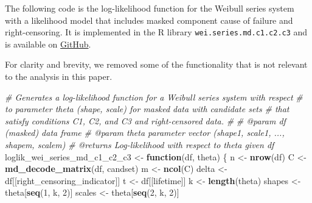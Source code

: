 \documentclass[
]{article}
\newenvironment{Shaded}{\begin{snugshade}}{\end{snugshade}}
\newcommand{\CommentTok}[1]{\textcolor[rgb]{0.56,0.35,0.01}{\textit{#1}}}
\newcommand{\ControlFlowTok}[1]{\textcolor[rgb]{0.13,0.29,0.53}{\textbf{#1}}}
\newcommand{\DecValTok}[1]{\textcolor[rgb]{0.00,0.00,0.81}{#1}}
\newcommand{\KeywordTok}[1]{\textcolor[rgb]{0.13,0.29,0.53}{\textbf{#1}}}
\newcommand{\NormalTok}[1]{#1}
\newcommand{\StringTok}[1]{\textcolor[rgb]{0.31,0.60,0.02}{#1}}
\begin{document}
\label{app:loglike-code}

The following code is the log-likelihood function for the Weibull series
system with a likelihood model that includes masked component cause of
failure and right-censoring. It is implemented in the R library
\texttt{wei.series.md.c1.c2.c3} and is available on
\href{https://github.com/queelius/wei.series.md.c1.c2.c3}{GitHub}.

For clarity and brevity, we removed some of the functionality that is
not relevant to the analysis in this paper.

\begin{Shaded}
\begin{Highlighting}[]
\CommentTok{\#\textquotesingle{} Generates a log{-}likelihood function for a Weibull series system with respect}
\CommentTok{\#\textquotesingle{} to parameter \textasciigrave{}theta\textasciigrave{} (shape, scale) for masked data with candidate sets}
\CommentTok{\#\textquotesingle{} that satisfy conditions C1, C2, and C3 and right{-}censored data.}
\CommentTok{\#\textquotesingle{}}
\CommentTok{\#\textquotesingle{} @param df (masked) data frame}
\CommentTok{\#\textquotesingle{} @param theta parameter vector (shape1, scale1, ..., shapem, scalem)}
\CommentTok{\#\textquotesingle{} @returns Log{-}likelihood with respect to \textasciigrave{}theta\textasciigrave{} given \textasciigrave{}df\textasciigrave{}}
\NormalTok{loglik\_wei\_series\_md\_c1\_c2\_c3 \textless{}{-}}\StringTok{ }\ControlFlowTok{function}\NormalTok{(df, theta) \{}
\NormalTok{    n \textless{}{-}}\StringTok{ }\KeywordTok{nrow}\NormalTok{(df)}
\NormalTok{    C \textless{}{-}}\StringTok{ }\KeywordTok{md\_decode\_matrix}\NormalTok{(df, candset)}
\NormalTok{    m \textless{}{-}}\StringTok{ }\KeywordTok{ncol}\NormalTok{(C)}
\NormalTok{    delta \textless{}{-}}\StringTok{ }\NormalTok{df[[right\_censoring\_indicator]]}
\NormalTok{    t \textless{}{-}}\StringTok{ }\NormalTok{df[[lifetime]]}
\NormalTok{    k \textless{}{-}}\StringTok{ }\KeywordTok{length}\NormalTok{(theta)}
\NormalTok{    shapes \textless{}{-}}\StringTok{ }\NormalTok{theta[}\KeywordTok{seq}\NormalTok{(}\DecValTok{1}\NormalTok{, k, }\DecValTok{2}\NormalTok{)]}
\NormalTok{    scales \textless{}{-}}\StringTok{ }\NormalTok{theta[}\KeywordTok{seq}\NormalTok{(}\DecValTok{2}\NormalTok{, k, }\DecValTok{2}\NormalTok{)]}


\end{Highlighting}
\end{Shaded}
\end{document}
